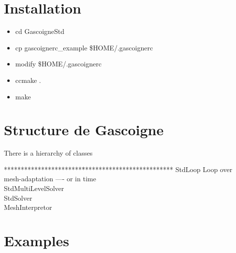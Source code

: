 \documentclass[12pt]{article}
\begin{document}
\title{}
\author{}
\date{}
\maketitle

%
%
\section{Installation}

\begin{itemize}
\item cd GascoigneStd
\item cp gascoignerc\_example \${HOME}/.gascoignerc
\item modify  \${HOME}/.gascoignerc
\item ccmake .
\item make 
\end{itemize}

%
%
\section{Structure de Gascoigne}

There is a hierarchy of classes
%
\begin{tabbing}
 ***********************\= ***************************\kill
 StdLoop\> Loop over mesh-adaptation  ---- or in time\\
 StdMultiLevelSolver\> \\
 StdSolver\> \\
 MeshInterpretor\>
\end{tabbing}



%
%
\section{Examples}
\end{document}
